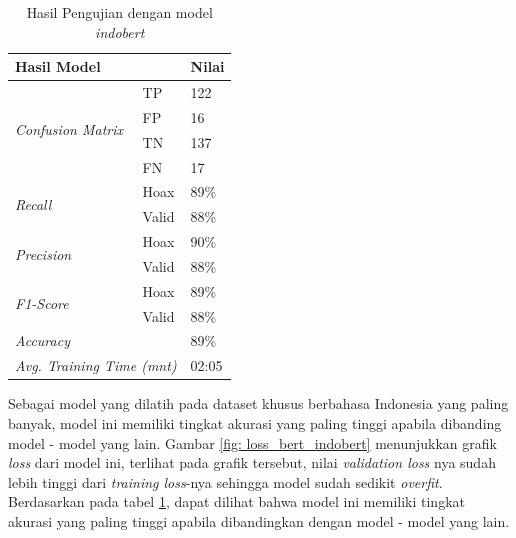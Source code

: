 \begin{table}[h]
    \caption{Hasil Pengujian dengan model \textit{indobert}}
    \label{tab: loss_indobert}
    \centering
    \begin{tabular}{|l|l|l|}
        \hline
        \multicolumn{2}{|l|}{\textbf{Hasil Model}}              & \textbf{Nilai}        \\ \hline
        \multirow{4}{*}{\textit{Confusion Matrix}}              & TP             & 122  \\ \cline{2-3}
                                                                & FP             & 16   \\ \cline{2-3}
                                                                & TN             & 137  \\ \cline{2-3}
                                                                & FN             & 17   \\ \hline
        \multirow{2}{*}{\textit{Recall}}                        & Hoax           & 89\% \\ \cline{2-3}
                                                                & Valid          & 88\% \\ \hline
        \multirow{2}{*}{\textit{Precision}}                     & Hoax           & 90\% \\ \cline{2-3}
                                                                & Valid          & 88\% \\ \hline
        \multirow{2}{*}{\textit{F1-Score}}                      & Hoax           & 89\% \\ \cline{2-3}
                                                                & Valid          & 88\% \\ \hline
        \multicolumn{2}{|l|}{\textit{Accuracy}}                 & 89\%                  \\ \hline
        \multicolumn{2}{|l|}{\textit{Avg. Training Time (mnt)}} & 02:05                 \\ \hline
    \end{tabular}
\end{table}

Sebagai model yang dilatih pada dataset khusus berbahasa Indonesia yang paling banyak, model ini memiliki tingkat akurasi yang paling tinggi apabila dibanding model - model yang lain. Gambar \ref{fig: loss_bert_indobert} menunjukkan grafik \textit{loss} dari model ini, terlihat pada grafik tersebut, nilai \textit{validation loss} nya sudah lebih tinggi dari \textit{training loss}-nya sehingga model sudah sedikit \textit{overfit}. Berdasarkan pada tabel \ref{tab: loss_indobert}, dapat dilihat bahwa model ini memiliki tingkat akurasi yang paling tinggi apabila dibandingkan dengan model - model yang lain.


